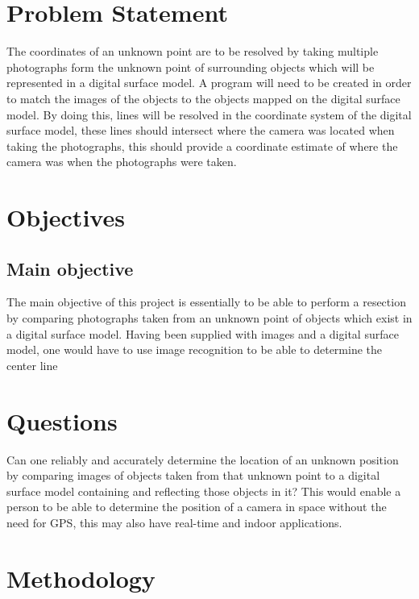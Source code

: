 \documentclass{article}
\begin{document}
\newpage

\section{Problem Statement}
The coordinates of an unknown point are to be resolved by taking multiple photographs form the unknown point of surrounding objects which will be represented in a digital surface model. A program will need to be created in order to match the images of the objects to the objects mapped on the digital surface model. By doing this, lines will be resolved in the coordinate system of the digital surface model, these lines should intersect where the camera was located when taking the photographs, this should provide a coordinate estimate of where the camera was when the photographs were taken.

\newpage

\section{Objectives}
\subsection{Main objective}
The main objective of this project is essentially to be able to perform a resection by comparing photographs taken from an unknown point of objects which exist in a digital surface model. Having been supplied with images and a digital surface model, one would have to use image recognition to be able to determine the center line 


\newpage

\section{Questions}

Can one reliably and accurately determine the location of an unknown position by comparing images of objects taken from that unknown point to a digital surface model containing and reflecting those objects in it? This would enable a person to be able to determine the position of a camera in space without the need for GPS, this may also have real-time and indoor applications.

\newpage

\section{Methodology}
\end{document}
